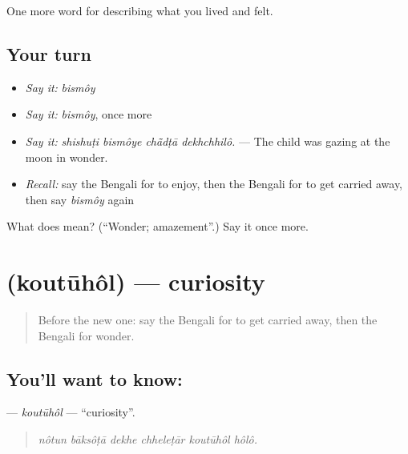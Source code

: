 \begin{grammarlens}[title={What you've built}]
One more word for describing what you lived and felt.
\end{grammarlens}

\subsection*{Your turn}
\begin{itemize}
\raggedright
  \item \emph{Say it:} \emph{bismôy}
  \item \emph{Say it:} \emph{bismôy}, once more
  \item \emph{Say it:} \emph{shishuṭi bismôye chā̃dṭā dekhchhilô.} — The child was gazing at the moon in wonder.
  \item \emph{Recall:} say the Bengali for to enjoy, then the Bengali for to get carried away, then say \emph{bismôy} again
\end{itemize}

\begin{tcolorbox}[breakable,colback=teal!4,colframe=teal!35!black,title={Before you move on}]
What does  mean? (\textquotedblleft{}Wonder; amazement\textquotedblright{}.) Say it once more.
\end{tcolorbox}
\section[\texorpdfstring{\bn{কৌতূহল} (koutūhôl)}{কৌতূহল (koutūhôl)}]{ (koutūhôl) — curiosity}

\label{lesson:BN-C440-koutuhol}



\begin{quote}
Before the new one: say the Bengali for to get carried away, then the Bengali for wonder.
\end{quote}

\subsection*{You'll want to know: }
\textbf{} — \emph{koutūhôl} — \textquotedblleft{}curiosity\textquotedblright{}.

\begin{quote}
     
\end{quote}

\begin{quote}
\emph{nôtun bāksôṭā dekhe chheleṭār koutūhôl hôlô.}
\end{quote}

